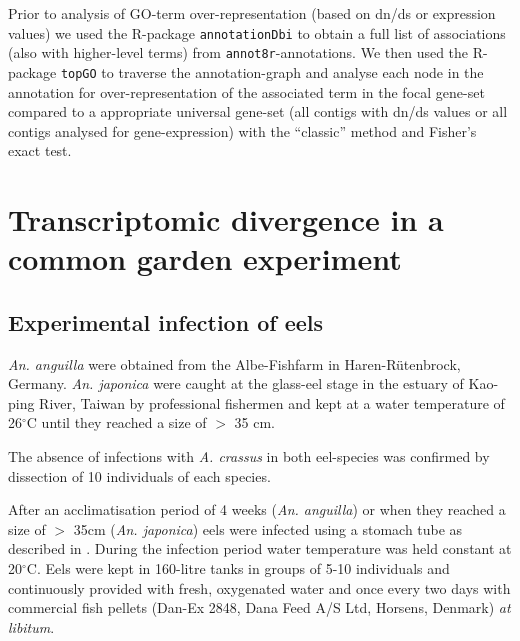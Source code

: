 Prior to analysis of GO-term over-representation (based on dn/ds or
expression values) we used the R-package \texttt{annotationDbi}
\cite{AnnotationDbi} to obtain a full list of associations (also with
higher-level terms) from \texttt{annot8r}-annotations. We then used the
R-package \texttt{topGO} \cite{topGO} to traverse the annotation-graph
and analyse each node in the annotation for over-representation of the
associated term in the focal gene-set compared to a appropriate
universal gene-set (all contigs with dn/ds values or all contigs
analysed for gene-expression) with the ``classic'' method and Fisher's
exact test.

\section{Transcriptomic divergence in a common garden experiment}

\subsection{Experimental infection of eels}

\textit{An. anguilla} were obtained from the Albe-Fishfarm in
Haren-R\"utenbrock, Germany. \textit{An. japonica} were caught at the
glass-eel stage in the estuary of Kao-ping River, Taiwan by
professional fishermen and kept at a water temperature of
26$^{\circ}$C until they reached a size of $>$ 35 cm.

The absence of infections with \textit{A. crassus} in both eel-species
was confirmed by dissection of 10 individuals of each species.

After an acclimatisation period of 4 weeks (\textit{An. anguilla}) or
when they reached a size of $>$ 35cm (\textit{An. japonica}) eels were
infected using a stomach tube as described in
\cite{boon1990effect}. During the infection period water temperature
was held constant at 20$^{\circ}$C. Eels were kept in 160-litre tanks
in groups of 5-10 individuals and continuously provided with fresh,
oxygenated water and once every two days with commercial fish pellets
(Dan-Ex 2848, Dana Feed A/S Ltd, Horsens, Denmark) \textit{at
  libitum}.

